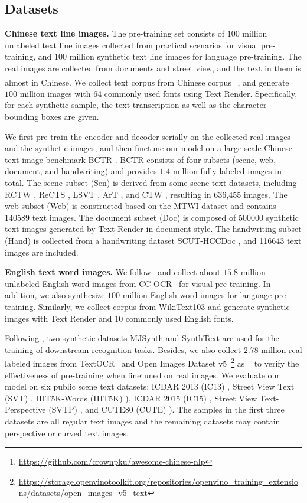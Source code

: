 \subsection{Datasets}
\noindent\textbf{Chinese text line images.} 
The pre-training set consists of $100$ million unlabeled text line images collected from practical scenarios for visual pre-training, and $100$ million synthetic  text line images for language pre-training. The real images are collected from documents and street view, and the text in them is almost in Chinese. We collect text corpus from Chinese corpus \footnote{\url{https://github.com/crownpku/awesome-chinese-nlp}}, and generate $100$ million images with $64$ commonly used fonts using Text Render. Specifically, for each synthetic sample, the text transcription as well as the character bounding boxes are given.

We first pre-train the encoder and decoder serially on the collected real images and the synthetic images, and then finetune our model on a large-scale Chinese text image benchmark BCTR \cite{chenBCTR}. BCTR consists of four subsets (scene, web, document, and handwriting) and provides $1.4$ million fully labeled images in total. The scene subset (Sen) is derived from some scene text datasets, including RCTW \cite{RCTW}, ReCTS \cite{rects}, LSVT \cite{lsvt}, ArT \cite{art}, and CTW \cite{CTW}, resulting in 636,455 images. The web subset (Web) is constructed based on the MTWI \cite{MTWI} dataset and contains 140589 text images. The document subset (Doc) is composed of 500000 synthetic text images generated by Text Render in document style. The handwriting subset (Hand) is collected from a handwriting dataset SCUT-HCCDoc \cite{scuthccdoc}, and 116643 text images are included. 

\vspace{2mm}
\noindent\textbf{English text word images.} 
We follow~\cite{dig} and  collect about $15.8$ million unlabeled English word images from CC-OCR~\cite{tap} for visual pre-training. In addition, we also synthesize $100$ million English word images for language pre-training. Similarly, we collect corpus from WikiText103 \cite{merity2016pointer} and generate synthetic images with Text Render and $10$ commonly used English fonts. 

Following \cite{shi2018aster,yu2020towards,ShanchengFang2021ReadLH,YuxinWang2021FromTT,XinyunZhang2022ContextbasedCL}, two synthetic datasets MJSynth \cite{mj} and SynthText \cite{st} are used for the training of downstream recognition tasks. Besides, we also collect 2.78 million real labeled images from TextOCR~\cite{TextOCR} and Open Images Dataset v5~\footnote{\url{https://storage.openvinotoolkit.org/repositories/openvino_training_extensions/datasets/open_images_v5_text}} as ~\cite{dig} to verify the effectiveness of pre-training when finetuned on real images.  We evaluate our model on six public scene text datasets: ICDAR 2013 (IC13) \cite{ic13}, Street View Text (SVT) \cite{wang2011end},  IIIT5K-Words (IIIT5K) \cite{iiit5k}), ICDAR 2015 (IC15) \cite{ic15}, Street View Text-Perspective (SVTP) \cite{svtp}, and CUTE80 (CUTE) \cite{cute}). The samples in the first three datasets are all regular text images and the remaining datasets may contain perspective or curved text images. 


